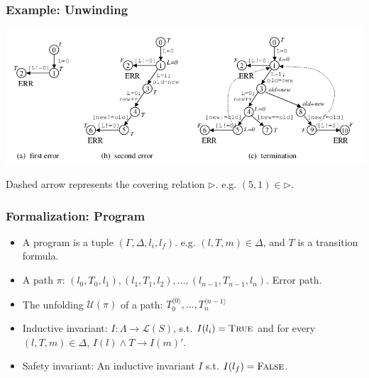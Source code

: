 \documentclass[aspectratio=1610, 13pt]{beamer}
\begin{document}
\begin{frame}\frametitle{Example: Unwinding}

\begin{center}
\includegraphics[scale=0.4]{2.png}
\end{center}
Dashed arrow represents the covering relation $\triangleright$. e.g. $(5,1)\in \triangleright$.


\end{frame}
\begin{frame}\frametitle{Formalization: Program}
\begin{itemize}
\item A program is a tuple $(\Gamma, \Delta, l_i, l_f)$. e.g. $(l, T, m)\in \Delta$, and $T$ is a transition formula.
\item A path $\pi$: $(l_0, T_0, l_1), (l_1, T_1, l_2), \ldots, (l_{n-1}, T_{n-1}, l_n)$. Error path.
\item The unfolding $\mathcal{U}(\pi)$ of a path: $T_0^{\langle 0\rangle}, \ldots, T_n^{\langle n-1\rangle}$
\item Inductive invariant: $I: \Lambda \rightarrow \mathcal{L}(S)$, s.t. $I(l_i) = \textsc{True}$ and for every $(l, T, m)\in \Delta
$, $I(l)\wedge T \rightarrow I(m)'$.

\item Safety invariant: An inductive invariant $I$ s.t. $I(l_f) = \textsc{False}$.
\end{itemize}
\end{frame}
\end{document}
